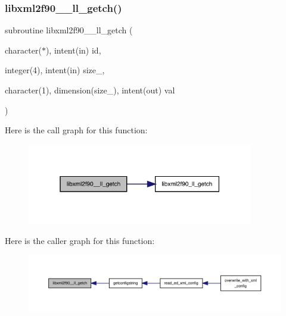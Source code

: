\subsubsection{\texorpdfstring{libxml2f90\+\_\+\+\_\+ll\+\_\+getch()}{libxml2f90\_\_ll\_getch()}}
{\footnotesize\ttfamily subroutine libxml2f90\+\_\+\+\_\+ll\+\_\+getch (\begin{DoxyParamCaption}\item[{character($\ast$), intent(in)}]{id,  }\item[{integer(4), intent(in)}]{size\+\_\+,  }\item[{character(1), dimension(size\+\_\+), intent(out)}]{val }\end{DoxyParamCaption})}

Here is the call graph for this function\+:
\nopagebreak
\begin{figure}[H]
\begin{center}
\leavevmode
\includegraphics[width=280pt]{libxml2f90_8f90__pp_8f90_a6197ea91babb017cbc3cec50fe124c03_cgraph}
\end{center}
\end{figure}
Here is the caller graph for this function\+:
\nopagebreak
\begin{figure}[H]
\begin{center}
\leavevmode
\includegraphics[width=350pt]{libxml2f90_8f90__pp_8f90_a6197ea91babb017cbc3cec50fe124c03_icgraph}
\end{center}
\end{figure}
\mbox{\label{libxml2f90_8f90__pp_8f90_ad30886dc2d259aec8eb502721e5347fc}} 
